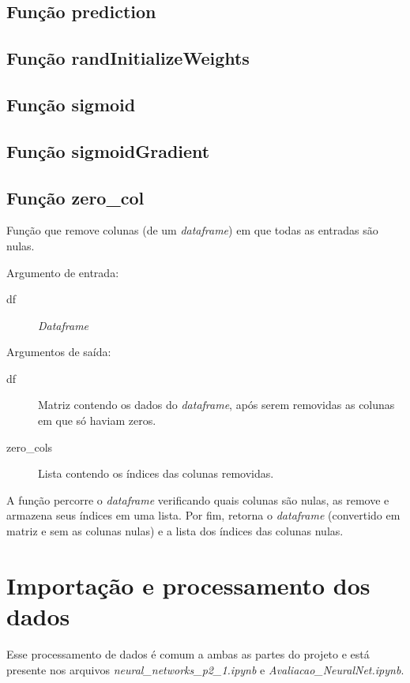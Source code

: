 \documentclass[12pt]{article}
\begin{document}
\subsection{Função prediction}

\subsection{Função randInitializeWeights}

\subsection{Função sigmoid}

\subsection{Função sigmoidGradient}

\subsection{Função zero\_col}
Função que remove colunas (de um \textit{dataframe}) em que todas as entradas são nulas.

Argumento de entrada:

\begin{description}
\item[df] \textit{Dataframe}
\end{description}

Argumentos de saída:
\begin{description}
\item[df] Matriz contendo os dados do \textit{dataframe}, após serem removidas as colunas em que só haviam zeros.

\item[zero\_cols] Lista contendo os índices das colunas removidas.
\end{description}

A função percorre o \textit{dataframe} verificando quais colunas são nulas, as remove e armazena seus índices em uma lista. Por fim, retorna o \textit{dataframe} (convertido em matriz e sem as colunas nulas) e a lista dos índices das colunas nulas.

\section{Importação e processamento dos dados} \label{dados}
Esse processamento de dados é comum a ambas as partes do projeto e está presente nos arquivos \textit{neural\_networks\_p2\_1.ipynb} e \textit{Avaliacao\_NeuralNet.ipynb}.
\end{document}
